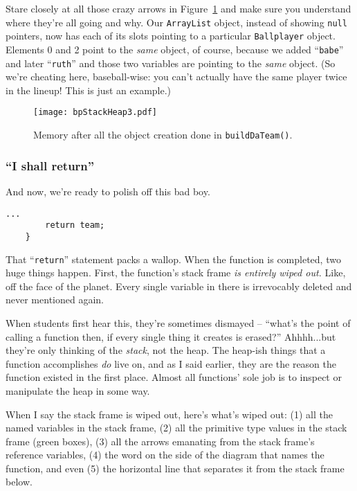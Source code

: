 Stare closely at all those crazy arrows in Figure~\ref{fig:bpStackHeap3} and
make sure you understand where they're all going and why. Our
\texttt{ArrayList} object, instead of showing \texttt{null} pointers, now has
each of its slots pointing to a particular \texttt{Ballplayer} object.
Elements 0 and 2 point to the \textit{same} object, of course, because we
added ``\texttt{babe}'' and later ``\texttt{ruth}'' and those two variables are
pointing to the \textit{same} object. (So we're cheating here, baseball-wise:
you can't actually have the same player twice in the lineup! This is just an
example.)

\begin{figure}[ht]   %
\centering
\texttt{[image: bpStackHeap3.pdf]}
\caption{Memory after all the object creation done in \texttt{buildDaTeam()}.}
\label{fig:bpStackHeap3}
\end{figure}

\subsubsection{``I shall return''}

And now, we're ready to polish off this bad boy.

\begin{Verbatim}[fontsize=\small,samepage=true,frame=single]
        ...
        return team;
    }
\end{Verbatim}


That ``\texttt{return}'' statement packs a wallop. When the function is
completed, two huge things happen. First, the function's stack frame
\textit{is entirely wiped out.} Like, off the face of the planet. Every single
variable in there is irrevocably deleted and never mentioned again.

When students first hear this, they're sometimes dismayed -- ``what's the
point of calling a function then, if every single thing it creates is erased?''
Ahhhh...but they're only thinking of the \textit{stack}, not the heap. The
heap-ish things that a function accomplishes \textit{do} live on, and as I
said earlier, they are the reason the function existed in the first place.
Almost all functions' sole job is to inspect or manipulate the heap in some
way.

When I say the stack frame is wiped out, here's what's wiped out: (1) all the
named variables in the stack frame, (2) all the primitive type values in the
stack frame (green boxes), (3) all the arrows emanating from the stack frame's
reference variables, (4) the word on the side of the diagram that names the
function, and even (5) the horizontal line that separates it from the stack
frame below.

